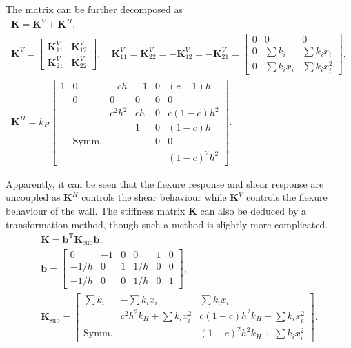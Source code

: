 \documentclass[3p]{elsarticle}
\newcommand*{\mT}{\mathrm{T}}
\begin{document}
The matrix can be further decomposed as
\begin{gather*}
\mathbf{K}=\mathbf{K}^V+\mathbf{K}^H,\\
\mathbf{K}^V=\left[\begin{array}{cc}
	\mathbf{K}^V_{11} & \mathbf{K}^V_{12} \\[2mm]
	\mathbf{K}^V_{21} & \mathbf{K}^V_{22}
\end{array}\right],\quad
\mathbf{K}^V_{11}=\mathbf{K}^V_{22}=-\mathbf{K}^V_{12}=-\mathbf{K}^V_{21}=\left[\begin{array}{ccc}
	0 &      0       &       0        \\[2mm]
	0 &  \sum{}k_i   &  \sum{}k_ix_i  \\[2mm]
	0 & \sum{}k_ix_i & \sum{}k_ix_i^2
\end{array}\right],\\
\mathbf{K}^H=k_H\left[\begin{array}{cccccc}
	1 &      0       &  -ch   & -1 & 0 &   (c-1)h   \\
	  &      0       &   0    & 0  & 0 &     0      \\
	  &              & c^2h^2 & ch & 0 & c(1-c)h^2  \\
	  &              &        & 1  & 0 &   (1-c)h   \\
	  & \text{Symm.} &        &    & 0 &     0      \\
	  &              &        &    &   & (1-c)^2h^2
\end{array}\right].
\end{gather*}

Apparently, it can be seen that the flexure response and shear response are uncoupled as $\mathbf{K}^H$ controls the shear behaviour while $\mathbf{K}^V$ controls the flexure behaviour of the wall. The stiffness matrix $\mathbf{K}$ can also be deduced by a transformation method, though such a method is slightly more complicated.
\begin{gather*}
\mathbf{K}=\mathbold{b}^\mT\mathbf{K}_\text{sub}\mathbold{b},\\
\mathbold{b}=\left[\begin{array}{cccccc}
	 0   & -1 & 0 &  0  & 1 & 0 \\
	-1/h & 0  & 1 & 1/h & 0 & 0 \\
	-1/h & 0  & 0 & 1/h & 0 & 1
\end{array}\right],\\
\mathbf{K}_\text{sub}=
\left[\begin{array}{ccc}
	 \sum{}k_i   &      -\sum{}k_ix_i       &         \sum{}k_ix_i         \\[2mm]
	             & c^2h^2k_H+\sum{}k_ix_i^2 & c(1-c)h^2k_H-\sum{}k_ix_i^2  \\[2mm]
	\text{Symm.} &                          & (1-c)^2h^2k_H+\sum{}k_ix_i^2
\end{array}\right].
\end{gather*}
\end{document}
